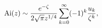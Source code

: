 \[\mathop{\mathrm{Ai}\/}\nolimits\!\left(z\right)\sim\frac{e^{-\zeta}}{2\sqrt{%
\pi}z^{1/4}}\sum_{k=0}^{\infty}(-1)^{k}\frac{u_{k}}{\zeta^{k}},\]
